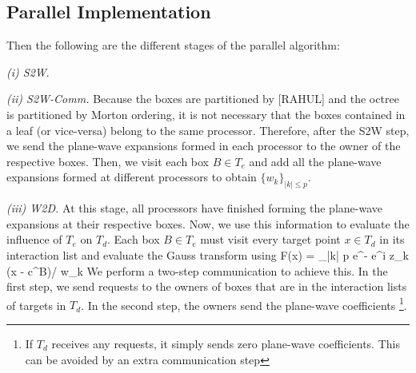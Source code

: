\subsection{Parallel Implementation}
\label{sc:parallelnufgt}

Then the following are the different stages of the parallel algorithm:

{\em (i) S2W}. 

{\em (ii) S2W-Comm.} Because the boxes are partitioned by [RAHUL] and the octree is partitioned by Morton ordering, it is not necessary that the boxes contained in a leaf (or vice-versa) belong to the same processor. Therefore, after the S2W step, we send the plane-wave expansions formed in each processor to the owner of the respective boxes. Then, we visit each box $B \in T_e$ and add all the plane-wave expansions formed at different processors to obtain $\{w_k \}_{|k| \leq p}$.  

{\em (iii) W2D.} At this stage, all processors have finished forming the plane-wave expansions at their respective boxes. 
Now, we use this information to evaluate the influence of $T_e$ on $T_d$. Each box $B \in T_e$ must visit every target point $x \in T_d$ in its interaction list and evaluate the Gauss transform using
%
\beq F(x) = \sum_{|k| \leq p} e^{-} e^{i z_k \cdot (x - c^B)/\sqrt{\delta}} w_k \eeq
%
We perform a two-step communication to achieve this. In the first step, we send requests to the owners of boxes that are in the interaction lists of targets in $T_d$. In the second step, the owners send the plane-wave coefficients \footnote{ If $T_d$ receives any requests, it simply sends zero plane-wave coefficients. This can be avoided by an extra communication step}. 

